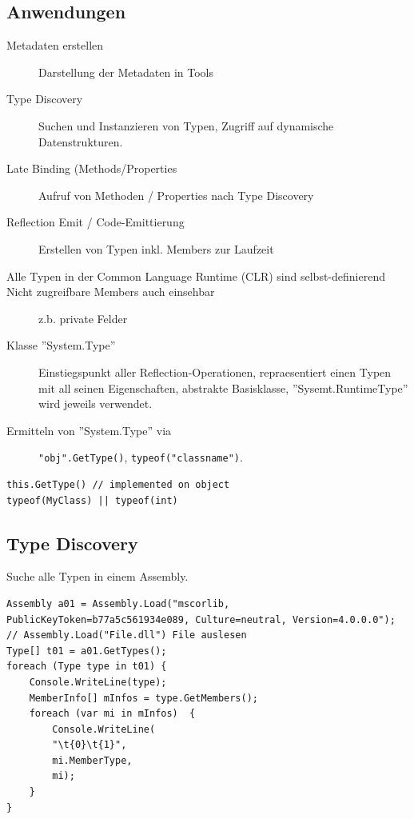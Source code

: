 \documentclass[
a4paper,
oneside,
10pt,
fleqn,
headsepline,
toc=listofnumbered, 
bibliography=totocnumbered]{scrartcl}
\begin{document}
\subsection{Anwendungen}
\begin{description}
	\item[Metadaten erstellen] Darstellung der Metadaten in Tools
	\item[Type Discovery] Suchen und Instanzieren von Typen, Zugriff auf dynamische Datenstrukturen.
	\item[Late Binding (Methods/Properties] Aufruf von Methoden / Properties nach Type Discovery
	\item[Reflection Emit / Code-Emittierung] Erstellen von Typen inkl. Members zur Laufzeit
	\item[Alle Typen in der Common Language Runtime (CLR) sind selbst-definierend]
	\item[Nicht zugreifbare Members auch einsehbar] z.b. private Felder
	\item[Klasse ''System.Type''] Einstiegspunkt aller Reflection-Operationen, repraesentiert einen Typen mit all seinen Eigenschaften, abstrakte Basisklasse, ''Sysemt.RuntimeType'' wird jeweils verwendet.
	\item[Ermitteln von ''System.Type'' via] \lstinline|"obj".GetType()|, \lstinline|typeof("classname")|.
\end{description}
\begin{lstlisting}
this.GetType() // implemented on object
typeof(MyClass) || typeof(int)
\end{lstlisting}

\subsection{Type Discovery}
Suche alle Typen in einem Assembly.
\begin{lstlisting}[caption=Reflection: Type Discovery]
Assembly a01 = Assembly.Load("mscorlib, PublicKeyToken=b77a5c561934e089, Culture=neutral, Version=4.0.0.0");
// Assembly.Load("File.dll") File auslesen
Type[] t01 = a01.GetTypes();
foreach (Type type in t01) {
	Console.WriteLine(type);
	MemberInfo[] mInfos = type.GetMembers();
	foreach (var mi in mInfos) 	{
		Console.WriteLine(
		"\t{0}\t{1}",
		mi.MemberType,
		mi);
	}
}
\end{lstlisting}
\end{document}
